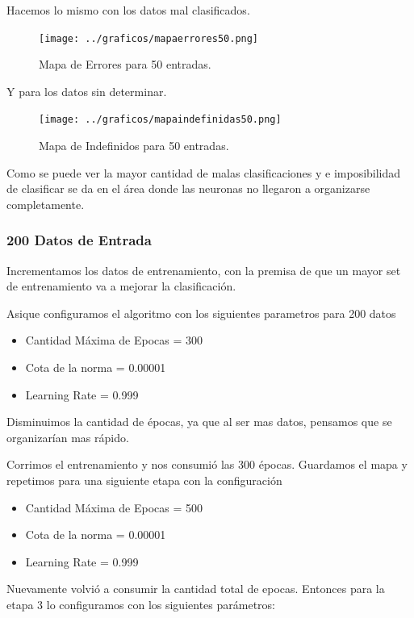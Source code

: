 Hacemos lo mismo con los datos mal clasificados.

\begin{figure}[H]
  \centering
  \texttt{[image: ../graficos/mapaerrores50.png]}
  \caption{Mapa de Errores para 50 entradas.}
  \label{fig:mapa errores 50}
\end{figure}


Y para los datos sin determinar.

\begin{figure}[H]
  \centering
  \texttt{[image: ../graficos/mapaindefinidas50.png]}
  \caption{Mapa de Indefinidos para 50 entradas.}
  \label{fig:mapa indefinidos 50}
\end{figure}


Como se puede ver la mayor cantidad de malas clasificaciones y e imposibilidad
de clasificar se da en el área donde las neuronas no llegaron a organizarse completamente.


\subsubsection{200 Datos de Entrada}

Incrementamos los datos de entrenamiento, con la premisa de que un mayor set de entrenamiento
va a mejorar la clasificación.

Asique configuramos el algoritmo con los siguientes parametros para 200 datos


\begin{itemize}
	\item Cantidad Máxima de Epocas = 300
	\item Cota de la norma = 0.00001
	\item Learning Rate = 0.999
\end{itemize}

Disminuimos la cantidad de épocas, ya que al ser mas datos, pensamos que se organizarían mas 
rápido.

Corrimos el entrenamiento y nos consumió las 300 épocas. Guardamos el mapa y repetimos para 
una siguiente etapa con la configuración

\begin{itemize}
	\item Cantidad Máxima de Epocas = 500
	\item Cota de la norma = 0.00001
	\item Learning Rate = 0.999
\end{itemize}

Nuevamente volvió a consumir la cantidad total de epocas. Entonces para la etapa 3 lo
configuramos con los siguientes parámetros:

